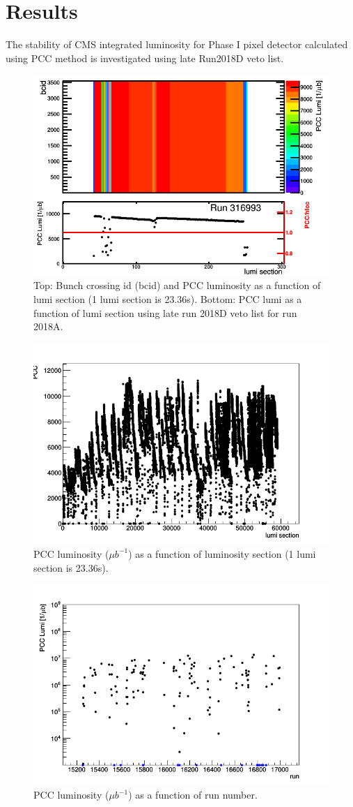 \newpage \section{Results}
\label{sec:results}

The stability of CMS integrated luminosity for Phase I pixel detector calculated using PCC method is investigated using late Run2018D veto list.

\begin{figure}[H]
  \centering
  \includegraphics[width=0.52\columnwidth]{./316993.png}
  \caption{Top: Bunch crossing id (bcid) and PCC luminosity as a function of lumi section (1 lumi section is 23.36s). Bottom: PCC lumi as a function of lumi section using late run 2018D veto list for run 2018A.}
  \label{fig:CMS}
\end{figure}


\begin{figure}[H]
  \centering
  \includegraphics[width=0.52\columnwidth]{./ls_lumi.png}
  \caption{PCC luminosity ($\mu b^{-1}$) as a function of luminosity section (1 lumi section is 23.36s).}
  \label{fig:CMS}
\end{figure}


\begin{figure}[H]
  \centering
  \includegraphics[width=0.52\columnwidth]{./runs.png}
  \caption{PCC luminosity ($\mu b^{-1}$) as a function of run number.}
  \label{fig:CMS}
\end{figure}


